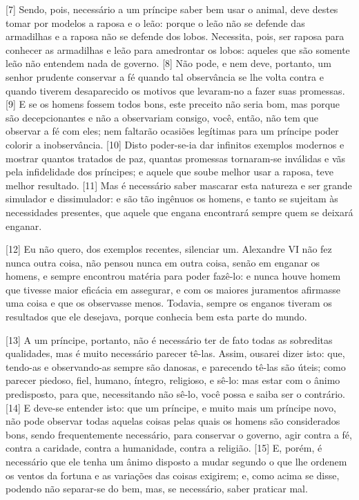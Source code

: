 {[}7{]} Sendo, pois, necessário a um príncipe saber bem usar o animal,
deve destes tomar por modelos a raposa e o leão: porque o leão não se
defende das armadilhas e a raposa não se defende dos lobos. Necessita,
pois, ser raposa para conhecer as armadilhas e leão para amedrontar os
lobos: aqueles que são somente leão não entendem nada de governo.
{[}8{]} Não pode, e nem deve, portanto, um senhor prudente conservar a
fé quando tal observância se lhe volta contra e quando tiverem
desaparecido os motivos que levaram-no a fazer suas promessas. {[}9{]} E
se os homens fossem todos bons, este preceito não seria bom, mas porque
são decepcionantes e não a observariam consigo, você, então, não tem que
observar a fé com eles; nem faltarão ocasiões legítimas para um príncipe
poder colorir a inobservância. {[}10{]} Disto poder-se-ia dar infinitos
exemplos modernos e mostrar quantos tratados de paz, quantas promessas
tornaram-se inválidas e vãs pela infidelidade dos príncipes; e aquele
que soube melhor usar a raposa, teve melhor resultado. {[}11{]} Mas é
necessário saber mascarar esta natureza e ser grande simulador e
dissimulador: e são tão ingênuos os homens, e tanto se sujeitam às
necessidades presentes, que aquele que engana encontrará sempre quem se
deixará enganar.

{[}12{]} Eu não quero, dos exemplos recentes, silenciar um. Alexandre VI
não fez nunca outra coisa, não pensou nunca em outra coisa, senão em
enganar os homens, e sempre encontrou matéria para poder fazê-lo: e
nunca houve homem que tivesse maior eficácia em assegurar, e com os
maiores juramentos afirmasse uma coisa e que os observasse menos.
Todavia, sempre os enganos tiveram os resultados que ele desejava,
porque conhecia bem esta parte do mundo.

{[}13{]} A um príncipe, portanto, não é necessário ter de fato todas as
sobreditas qualidades, mas é muito necessário parecer tê-las. Assim,
ousarei dizer isto: que, tendo-as e observando-as sempre são danosas, e
parecendo tê-las são úteis; como parecer piedoso, fiel, humano, íntegro,
religioso, e sê-lo: mas estar com o ânimo predisposto, para que,
necessitando não sê-lo, você possa e saiba ser o contrário. {[}14{]} E
deve-se entender isto: que um príncipe, e muito mais um príncipe novo,
não pode observar todas aquelas coisas pelas quais os homens são
considerados bons, sendo frequentemente necessário, para conservar o
governo, agir contra a fé, contra a caridade, contra a humanidade,
contra a religião. {[}15{]} E, porém, é necessário que ele tenha um
ânimo disposto a mudar segundo o que lhe ordenem os ventos da fortuna e
as variações das coisas exigirem; e, como acima se disse, podendo não
separar-se do bem, mas, se necessário, saber praticar mal.


